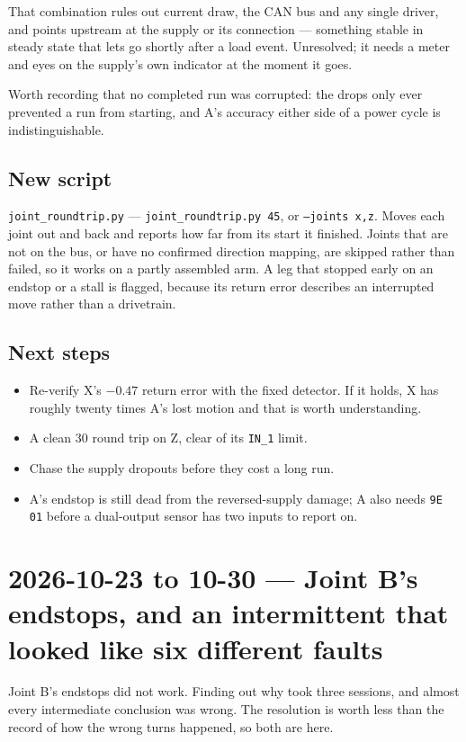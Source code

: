 \documentclass[11pt,letterpaper]{article}
\begin{document}
That combination rules out current draw, the CAN bus and any single driver, and
points upstream at the supply or its connection --- something stable in steady
state that lets go shortly after a load event. Unresolved; it needs a meter and
eyes on the supply's own indicator at the moment it goes.

Worth recording that no completed run was corrupted: the drops only ever
prevented a run from starting, and A's accuracy either side of a power cycle is
indistinguishable.

\subsection{New script}
\texttt{joint\_roundtrip.py} --- \texttt{joint\_roundtrip.py 45}, or
\texttt{--joints x,z}. Moves each joint out and back and reports how far from its
start it finished. Joints that are not on the bus, or have no confirmed direction
mapping, are skipped rather than failed, so it works on a partly assembled arm.
A leg that stopped early on an endstop or a stall is flagged, because its return
error describes an interrupted move rather than a drivetrain.

\subsection{Next steps}
\begin{itemize}
    \item Re-verify X's $-0.47$\textdegree{} return error with the fixed
    detector. If it holds, X has roughly twenty times A's lost motion and that is
    worth understanding.
    \item A clean 30\textdegree{} round trip on Z, clear of its
    \texttt{IN\_1} limit.
    \item Chase the supply dropouts before they cost a long run.
    \item A's endstop is still dead from the reversed-supply damage; A also needs
    \texttt{9E 01} before a dual-output sensor has two inputs to report on.
\end{itemize}

\section{2026-10-23 to 10-30 --- Joint B's endstops, and an intermittent that looked like six different faults}
\label{sec:session-2026-10-30}
Joint B's endstops did not work. Finding out why took three sessions, and almost
every intermediate conclusion was wrong. The resolution is worth less than the
record of how the wrong turns happened, so both are here.
\end{document}
